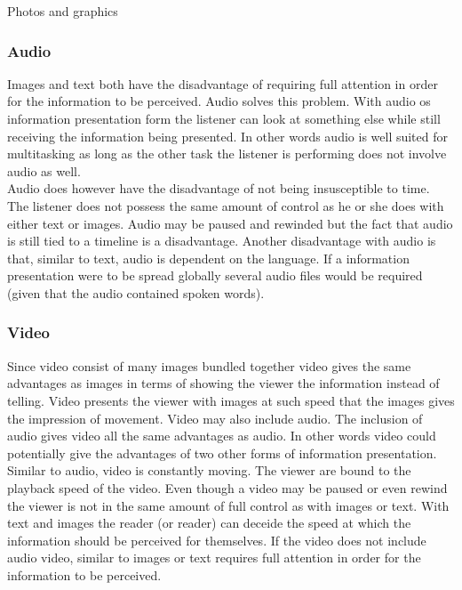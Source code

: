 Photos and graphics


\subsubsection{Audio}
Images and text both have the disadvantage of requiring full attention in order for the information to be perceived. Audio solves this problem. With audio os information presentation form the listener can look at something else while still receiving the information being presented. In other words audio is well suited for multitasking as long as the other task the listener is performing does not involve audio as well.\\

Audio does however have the disadvantage of not being insusceptible to time. The listener does not possess the same amount of control as he or she does with either text or images. Audio may be paused and rewinded but the fact that audio is still tied to a timeline is a disadvantage. Another disadvantage with audio is that, similar to text, audio is dependent on the language. If a information presentation were to be spread globally several audio files would be required (given that the audio contained spoken words).

\subsubsection{Video}
Since video consist of many images bundled together video gives the same advantages as images in terms of showing the viewer the information instead of telling. Video presents the viewer with images at such speed that the images gives the impression of movement. Video may also include audio. The inclusion of audio gives video all the same advantages as audio. In other words video could potentially give the advantages of two other forms of information presentation.\\

Similar to audio, video is constantly moving. The viewer are bound to the playback speed of the video. Even though a video may be paused or even rewind the viewer is not in the same amount of full control as with images or text. With text and images the reader (or reader) can deceide the speed at which the information should be perceived for themselves. If the video does not include audio video, similar to images or text requires full attention in order for the information to be perceived.